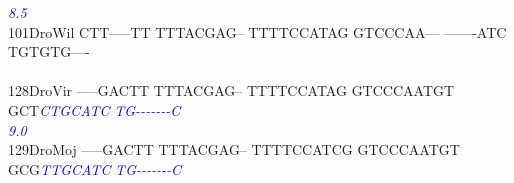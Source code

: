 \documentclass[11pt,twoside,reqno,a4paper]{article}
\begin{document}
{\hspace*{4\charwidth}\hspace*{7\charwidth}\hspace*{1\charwidth}\hspace*{1\charwidth}\hspace*{1\charwidth}\hspace*{1\charwidth}\hspace*{43\charwidth}\textit{\textcolor{Blue}{8.5}}\hspace*{1\charwidth}\hspace*{1\charwidth}\\
101\hspace*{1\charwidth}DroWil	CTT-----TT	TTTACGAG--	TTTTCCATAG	GTCCCAA---	-------ATC	TGTGTG----	\\
\hspace*{4\charwidth}\hspace*{7\charwidth}\hspace*{1\charwidth}\hspace*{1\charwidth}\hspace*{1\charwidth}\hspace*{1\charwidth}\hspace*{1\charwidth}\hspace*{1\charwidth}\\
128\hspace*{1\charwidth}DroVir	-----GACTT	TTTACGAG--	TTTTCCATAG	GTCCCAATGT	GCT\textit{\textcolor{Blue}{C}}\textit{\textcolor{Blue}{T}}\textit{\textcolor{Blue}{G}}\textit{\textcolor{Blue}{C}}\textit{\textcolor{Blue}{A}}\textit{\textcolor{Blue}{T}}\textit{\textcolor{Blue}{C}}	\textit{\textcolor{Blue}{T}}\textit{\textcolor{Blue}{G}}\textit{\textcolor{Blue}{-}}\textit{\textcolor{Blue}{-}}\textit{\textcolor{Blue}{-}}\textit{\textcolor{Blue}{-}}\textit{\textcolor{Blue}{-}}\textit{\textcolor{Blue}{-}}\textit{\textcolor{Blue}{-}}\textit{\textcolor{Blue}{C}}	\\
\hspace*{4\charwidth}\hspace*{7\charwidth}\hspace*{1\charwidth}\hspace*{1\charwidth}\hspace*{1\charwidth}\hspace*{1\charwidth}\hspace*{43\charwidth}\textit{\textcolor{Blue}{9.0}}\hspace*{1\charwidth}\hspace*{1\charwidth}\\
129\hspace*{1\charwidth}DroMoj	-----GACTT	TTTACGAG--	TTTTCCATCG	GTCCCAATGT	GCG\textit{\textcolor{Blue}{T}}\textit{\textcolor{Blue}{T}}\textit{\textcolor{Blue}{G}}\textit{\textcolor{Blue}{C}}\textit{\textcolor{Blue}{A}}\textit{\textcolor{Blue}{T}}\textit{\textcolor{Blue}{C}}	\textit{\textcolor{Blue}{T}}\textit{\textcolor{Blue}{G}}\textit{\textcolor{Blue}{-}}\textit{\textcolor{Blue}{-}}\textit{\textcolor{Blue}{-}}\textit{\textcolor{Blue}{-}}\textit{\textcolor{Blue}{-}}\textit{\textcolor{Blue}{-}}\textit{\textcolor{Blue}{-}}\textit{\textcolor{Blue}{C}}	\\
}
\end{document}
